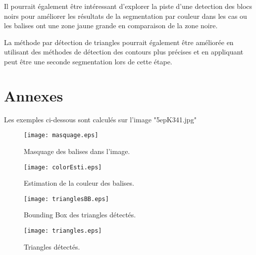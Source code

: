 \documentclass{article}
\begin{document}
Il pourrait également être intéressant d'explorer la piste d'une detection des
blocs noirs pour améliorer les résultats de la segmentation par couleur dans
les cas ou les balises ont une zone jaune grande en comparaison de la zone
noire.

La méthode par détection de triangles pourrait également être améliorée en
utilisant des méthodes de détection des contours plus précises et en appliquant
peut être une seconde segmentation lors de cette étape.

\section{Annexes}

Les exemples ci-dessous sont calculés sur l'image "5epK341.jpg"
\begin{figure}[h!]
    \centering
    \begin{minipage}{0.45\textwidth}
        \centering
        \texttt{[image: masquage.eps]}
        \caption{Masquage des balises dans l'image.}
    \end{minipage}\hfill
    \begin{minipage}{0.45\textwidth}
        \centering
        \texttt{[image: colorEsti.eps]}
        \caption{Estimation de la couleur des balises.}
    \end{minipage}

\end{figure}
\begin{figure}[h!]
    \centering\begin{minipage}{0.45\textwidth}
        \centering
        \texttt{[image: trianglesBB.eps]}
        \caption{Bounding Box des triangles détectés.}
    \end{minipage}
    \begin{minipage}{0.45\textwidth}
        \centering
        \texttt{[image: triangles.eps]}
        \caption{Triangles détectés.}
    \end{minipage}\hfill

\end{figure}
\end{document}
